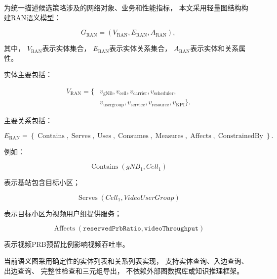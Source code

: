 \documentclass[lang=cn,12pt]{elegantbook}
\begin{document}
为统一描述候选策略涉及的网络对象、业务和性能指标，
本文采用轻量图结构构建RAN语义模型：

\begin{equation}
G_{\mathrm{RAN}}
=
\left(
V_{\mathrm{RAN}},
E_{\mathrm{RAN}},
A_{\mathrm{RAN}}
\right),
\label{eq:ran_semantic_graph}
\end{equation}

其中，
$V_{\mathrm{RAN}}$表示实体集合，
$E_{\mathrm{RAN}}$表示实体关系集合，
$A_{\mathrm{RAN}}$表示实体和关系属性。

实体主要包括：

\begin{equation}
\begin{aligned}
V_{\mathrm{RAN}}
=
\{&
v_{\mathrm{gNB}},
v_{\mathrm{cell}},
v_{\mathrm{carrier}},
v_{\mathrm{scheduler}},
\\
&
v_{\mathrm{usergroup}},
v_{\mathrm{service}},
v_{\mathrm{resource}},
v_{\mathrm{KPI}}
\}.
\end{aligned}
\label{eq:ran_entity_types}
\end{equation}

主要关系包括：

\begin{equation}
E_{\mathrm{RAN}}
=
\left\{
\operatorname{Contains},
\operatorname{Serves},
\operatorname{Uses},
\operatorname{Consumes},
\operatorname{Measures},
\operatorname{Affects},
\operatorname{ConstrainedBy}
\right\}.
\label{eq:ran_relation_types}
\end{equation}

例如：

\begin{equation}
\operatorname{Contains}
\left(
gNB_1,
Cell_1
\right)
\end{equation}

表示基站包含目标小区；

\begin{equation}
\operatorname{Serves}
\left(
Cell_1,
VideoUserGroup
\right)
\end{equation}

表示目标小区为视频用户组提供服务；

\begin{equation}
\operatorname{Affects}
\left(
\texttt{reservedPrbRatio},
\texttt{videoThroughput}
\right)
\end{equation}

表示视频PRB预留比例影响视频吞吐率。

当前语义图采用确定性的实体列表和关系列表实现，
支持实体查询、入边查询、出边查询、
完整性检查和三元组导出，
不依赖外部图数据库或知识推理框架。
\end{document}
